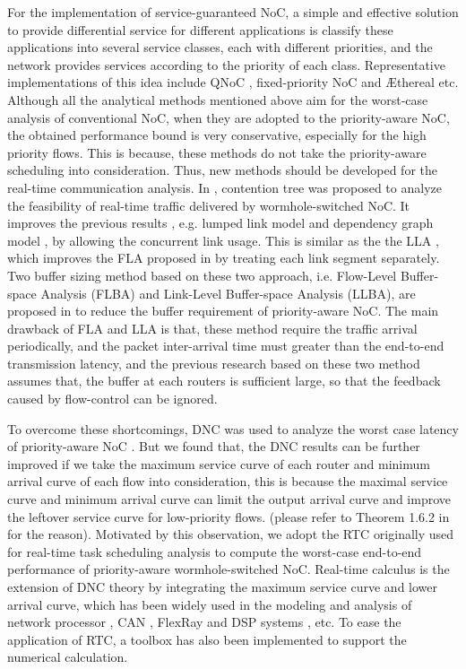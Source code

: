 \documentclass[10pt,journal]{IEEEtran}
\begin{document}
For the implementation of service-guaranteed NoC, a simple and effective solution to provide differential service for different applications is classify these applications into several service classes, each with different priorities, and the network provides services according to the priority of each class. Representative implementations of this idea include QNoC \cite{BCGK04}, fixed-priority NoC \cite{Shi:2008:RCA:1397757.1397996} and {{\AE}thereal} \cite{GoDR05} etc. Although all the analytical methods mentioned above aim for the worst-case analysis of conventional NoC, when they are adopted to the priority-aware NoC, the obtained performance bound is very conservative, especially for the high priority flows. This is because, these methods do not take the priority-aware scheduling into consideration. Thus, new methods should be developed for the real-time communication analysis. In \cite{LuJS05}, contention tree was proposed to analyze the feasibility of real-time traffic delivered by wormhole-switched NoC. It improves the previous results , e.g. lumped link model \cite{707545} and dependency graph model \cite{708526}, by allowing the concurrent link usage. This is similar as the the LLA \cite{73}, which improves the FLA proposed in \cite{Shi:2008:RCA:1397757.1397996} by treating each link segment separately. Two buffer sizing method based on these two approach, i.e. Flow-Level Buffer-space Analysis (FLBA) and Link-Level Buffer-space Analysis (LLBA), are proposed in \cite{189} to reduce the buffer requirement of priority-aware NoC. The main drawback of FLA and LLA is that, these method require the traffic arrival periodically, and the packet inter-arrival time must greater than the end-to-end transmission latency, and the previous research based on these two method assumes that, the buffer at each routers is sufficient large, so that the feedback caused by flow-control can be ignored.

To overcome these shortcomings, DNC was used to analyze the worst case latency of priority-aware NoC \cite{Qian489900}. But we found that, the DNC results can be further improved if we take the maximum service curve of each router and minimum arrival curve of each flow into consideration, this is because the maximal service curve and minimum arrival curve can limit the output arrival curve and improve the leftover service curve for low-priority flows. (please refer to Theorem 1.6.2 in \cite{Boudec2001Network} for the reason). Motivated by this observation, we adopt the RTC \cite{1253607} originally used for real-time task scheduling analysis to compute the worst-case end-to-end performance of priority-aware wormhole-switched NoC. Real-time calculus is the extension of DNC theory by integrating the maximum service curve and lower arrival curve, which has been widely used in the modeling and analysis of network processor \cite{1253838}, CAN \cite{4617308}, FlexRay \cite{Hagiescu:2007:PAF:1278480.1278554} and DSP systems \cite{thiele2005performance}, etc. To ease the application of RTC, a toolbox \cite{rtc} has also been implemented to support the numerical calculation.
\end{document}

